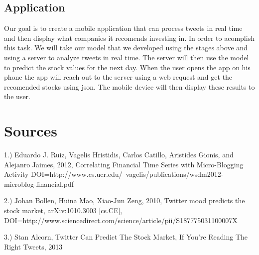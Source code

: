 \documentclass{acm_proc_article-sp}
\begin{document}
\subsection{Application}

Our goal is to create a mobile application that can process tweets in real time
and then display what companies it recomends investing in. In order to
acomplish this task. We will take our model that we developed using the stages
above and using a server to analyze tweets in real time. The server will then
use the model to predict the stock values for the next day. When the user opens
the app on his phone the app will reach out to the server using a web request
and get the recomended stocks using json. The mobile device will then display
these results to the user.

\section{Sources}

1.) Eduardo J. Ruiz, Vagelis Hristidis, Carlos Catillo, Aristides Gionis, and
Alejanro Jaimes,  2012, Correlating Financial Time Series with Micro-Blogging
Activity DOI=http://www.cs.ucr.edu/~vagelis/publications/wsdm2012-microblog-financial.pdf 

2.) Johan Bollen, Huina Mao, Xiao-Jun Zeng, 2010, Twitter mood predicts the stock
market, arXiv:1010.3003 [cs.CE], DOI=http://www.sciencedirect.com/science/article/pii/S187775031100007X


3.) Stan Alcorn, Twitter Can Predict The Stock Market, If You're Reading The Right
Tweets, 2013

 
\end{document}
